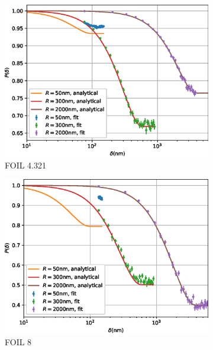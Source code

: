 \documentclass{article}
\begin{document}
\begin{figure}[p]
	\centering
	\begin{subfigure}[b]{0.45\textwidth}
		\centering
		\includegraphics[width=\textwidth]{simulation-plot-rms-FOIL-4.321}
		\caption{FOIL 4.321}
		\label{fig:simulation-plot-rms-FOIL-4.321}
	\end{subfigure}
	\hfill
	\begin{subfigure}[b]{0.45\textwidth}
		\centering
		\includegraphics[width=\textwidth]{simulation-plot-rms-FOIL-8}
		\caption{FOIL 8}
		\label{fig:simulation-plot-rms-FOIL-8}
	\end{subfigure}
	\centering
	\begin{subfigure}[b]{0.45\textwidth}
		\centering

\end{subfigure}
\end{figure}
\end{document}
